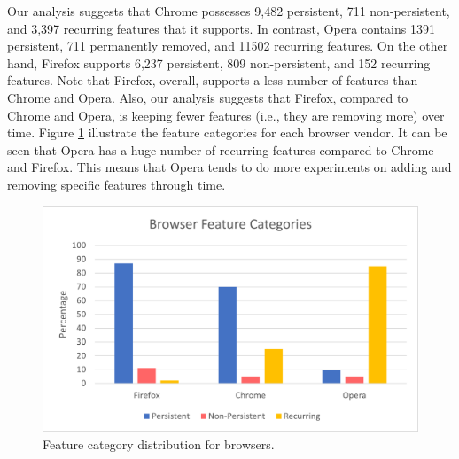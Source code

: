 Our analysis suggests that Chrome possesses 9,482 persistent, 711
non-persistent, and 3,397 recurring features that it supports. In contrast,
Opera contains 1391 persistent, 711 permanently removed, and 11502 recurring
features. On the other hand, Firefox supports 6,237 persistent, 809 non-persistent, and
152 recurring features. Note that Firefox, overall, supports a less
number of features than Chrome and Opera. Also, our analysis suggests that Firefox,
compared to Chrome and Opera, is keeping fewer features (i.e., they are removing
more) over time. Figure \ref{fig:feature-categories} illustrate the feature categories for
each browser vendor. It can be seen that Opera has a huge number of recurring features
compared to Chrome and Firefox. This means that Opera tends to do more experiments
on adding and removing specific features through time.

\begin{figure}[ht]
  \centering
  \includegraphics[width=\columnwidth]{figures/feature-categories-bar.png}
  \caption{Feature category distribution for browsers.}
  \label{fig:feature-categories}
\end{figure}




